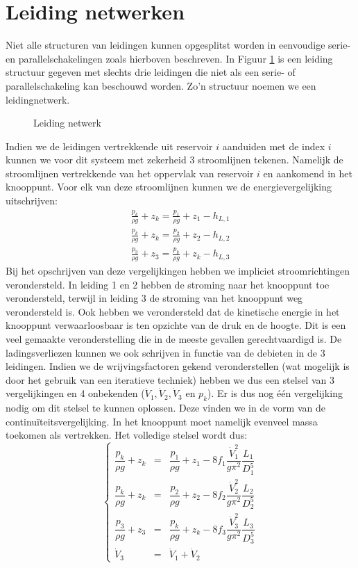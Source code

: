 	\section{Leiding netwerken}
	\label{sec:Leiding netwerken}	
Niet alle structuren van leidingen kunnen opgesplitst worden in eenvoudige serie- en parallelschakelingen zoals hierboven beschreven. In Figuur \ref{fig:leidingnetwerk} is een leiding structuur gegeven met slechts drie leidingen die niet als een serie- of parallelschakeling kan beschouwd worden. Zo'n structuur noemen we een leidingnetwerk.
\begin{figure}
	\centering
	
	\caption{Leiding netwerk}
	\label{fig:leidingnetwerk}
\end{figure}
Indien we de leidingen vertrekkende uit reservoir $i$ aanduiden met de index $i$ kunnen we voor dit systeem met zekerheid 3 stroomlijnen tekenen. Namelijk de stroomlijnen vertrekkende van het oppervlak van reservoir $i$ en aankomend in het knooppunt. Voor elk van deze stroomlijnen kunnen we de energievergelijking uitschrijven:
\begin{eqnarray}
	\frac{p_k}{\rho g} + z_k = \frac{p_1}{\rho g} + z_1 - h_{L,1} \nonumber \\
	\frac{p_k}{\rho g} + z_k = \frac{p_2}{\rho g} + z_2 - h_{L,2} \\
	\frac{p_3}{\rho g} + z_3 = \frac{p_k}{\rho g} + z_k - h_{L,3} \nonumber
\end{eqnarray} 
Bij het opschrijven van deze vergelijkingen hebben we impliciet stroomrichtingen verondersteld. In leiding 1 en 2 hebben de stroming naar het knooppunt toe verondersteld, terwijl in leiding 3 de stroming van het knooppunt weg verondersteld is. Ook hebben we verondersteld dat de kinetische energie in het knooppunt verwaarloosbaar is ten opzichte van de druk en de hoogte. Dit is een veel gemaakte veronderstelling die in de meeste gevallen gerechtvaardigd is. De ladingsverliezen kunnen we ook schrijven in functie van de debieten in de 3 leidingen. Indien we de wrijvingsfactoren gekend veronderstellen (wat mogelijk is door het gebruik van een iteratieve techniek) hebben we dus een stelsel van 3 vergelijkingen en 4 onbekenden ($\dot{V}_1,\dot{V}_2,\dot{V}_3$ en $p_k$). Er is dus nog één vergelijking nodig om dit stelsel te kunnen oplossen. Deze vinden we in de vorm van de continuïteitsvergelijking. In het knooppunt moet namelijk evenveel massa toekomen als vertrekken. Het volledige stelsel wordt dus:
\begin{equation}
	\left\{
	\begin{array}{lcl}
		\dfrac{p_k}{\rho g} + z_k &=& \dfrac{p_1}{\rho g} + z_1 - 8 f_1 \dfrac{\dot{V}_1^2}{g \pi^2} \dfrac{L_1}{D_1^5} \\
		\dfrac{p_k}{\rho g} + z_k &=& \dfrac{p_2}{\rho g} + z_2 - 8 f_2 \dfrac{\dot{V}_2^2}{g \pi^2} \dfrac{L_2}{D_2^5} \\
		\dfrac{p_3}{\rho g} + z_3 &=& \dfrac{p_k}{\rho g} + z_k - 8 f_3 \dfrac{\dot{V}_3^2}{g \pi^2} \dfrac{L_3}{D_3^5} \\
		\dot{V}_3 &=& \dot{V}_1 + \dot{V}_2
	\end{array}
	\right.
\end{equation}

